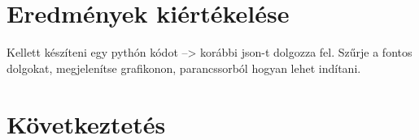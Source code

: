 \section{Eredmények kiértékelése}
Kellett készíteni egy pythón kódot --> korábbi json-t dolgozza fel. Szűrje a fontos dolgokat, megjelenítse grafikonon, parancssorból hogyan lehet indítani.

\section{Következtetés}
